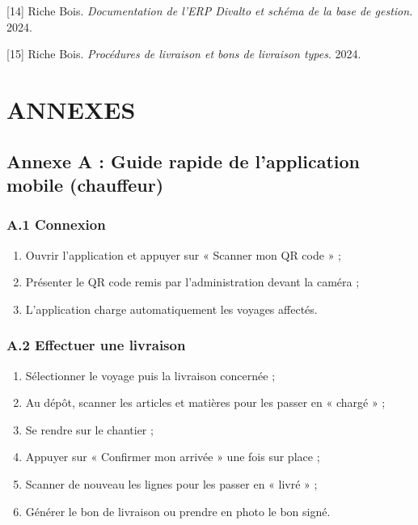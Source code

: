 \documentclass[12pt,a4paper]{report}
\begin{document}
[14] Riche Bois. \textit{Documentation de l'ERP Divalto et schéma de la base de gestion}. 2024.

[15] Riche Bois. \textit{Procédures de livraison et bons de livraison types}. 2024.

\newpage

\chapter*{ANNEXES}

\section*{Annexe A : Guide rapide de l'application mobile (chauffeur)}

\subsection*{A.1 Connexion}

\begin{enumerate}
\item Ouvrir l'application et appuyer sur « Scanner mon QR code » ;
\item Présenter le QR code remis par l'administration devant la caméra ;
\item L'application charge automatiquement les voyages affectés.
\end{enumerate}

\subsection*{A.2 Effectuer une livraison}

\begin{enumerate}
\item Sélectionner le voyage puis la livraison concernée ;
\item Au dépôt, scanner les articles et matières pour les passer en « chargé » ;
\item Se rendre sur le chantier ;
\item Appuyer sur « Confirmer mon arrivée » une fois sur place ;
\item Scanner de nouveau les lignes pour les passer en « livré » ;
\item Générer le bon de livraison ou prendre en photo le bon signé.
\end{enumerate}
\end{document}

